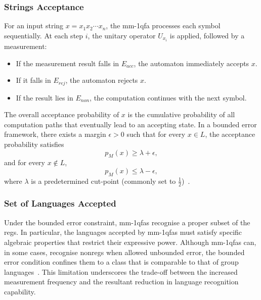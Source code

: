 \subsubsection{Strings Acceptance}
For an input string $x=x_1x_2\cdots x_n$, the \gls{mm-1qfa} processes each symbol sequentially. At each step $i$, the unitary operator $U_{x_i}$ is applied, followed by a measurement:
\begin{itemize}
    \item If the measurement result falls in $E_{acc}$, the automaton immediately accepts $x$.
    \item If it falls in $E_{rej}$, the automaton rejects $x$.
    \item If the result lies in $E_{non}$, the computation continues with the next symbol.
\end{itemize}
The overall acceptance probability of $x$ is the cumulative probability of all computation paths that eventually lead to an accepting state. In a bounded error framework, there exists a margin $\epsilon > 0$ such that for every $x\in L$, the acceptance probability satisfies
\[
p_M(x) \ge \lambda + \epsilon,
\]
and for every $x\notin L$, 
\[
p_M(x) \le \lambda - \epsilon,
\]
where $\lambda$ is a predetermined cut-point (commonly set to $\frac{1}{2}$)~\cite{kondacs1997power,brodsky2002characterizations}.

\subsubsection{Set of Languages Accepted}
Under the bounded error constraint, \glspl{mm-1qfa} recognise a proper subset of the \glspl{reg}. In particular, the languages accepted by \glspl{mm-1qfa} must satisfy specific algebraic properties that restrict their expressive power. Although \glspl{mm-1qfa} can, in some cases, recognise non\glspl{reg} when allowed unbounded error, the bounded error condition confines them to a class that is comparable to that of group languages~\cite{brodsky2002characterizations,kondacs1997power}. This limitation underscores the trade-off between the increased measurement frequency and the resultant reduction in language recognition capability.

